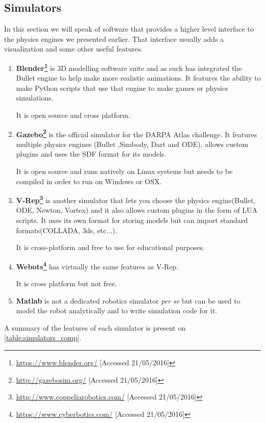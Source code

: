 \subsection{Simulators}
In this section we will speak of software that provides a higher level interface to the physics engines we presented earlier. That interface usually adds a visualization and some other useful features.
\begin{enumerate}

\item \textbf{Blender\footnote{\url{https://www.blender.org/} [Accessed 21/05/2016]}} is 3D modelling software suite and as such has integrated the Bullet engine to help make more realistic animations. It features the ability to make Python scripts that use that engine to make games or physics simulations. 

It is open source and cross platform.

\item \textbf{Gazebo\footnote{\url{http://gazebosim.org/} [Accessed 21/05/2016]}} is the official simulator for the DARPA Atlas challenge. It features multiple physics engines (Bullet ,Simbody, Dart and ODE), allows custom plugins and uses the SDF format for its models. 

It is open source and runs natively on Linux systems but needs to be compiled in order to run on Windows or OSX.

\item \textbf{V-Rep\footnote{\url{http://www.coppeliarobotics.com/} [Accessed 21/05/2016]}} is another simulator that lets you choose the physics engine(Bullet, ODE, Newton, Vortex) and it also allows custom plugins in the form of LUA scripts. It uses its own format for storing models but can import standard formats(COLLADA, 3ds, etc...).

It is cross-platform and free to use for educational purposes.

\item \textbf{Webots\footnote{\url{https://www.cyberbotics.com/} [Accessed 21/05/2016]}} has virtually the same features as V-Rep.

It is cross platform but not free.

\item \textbf{Matlab} is not a dedicated robotics simulator \textit{per se} but can be used to model the robot analytically and to write simulation code for it. 
\end{enumerate}

A summary of the features of each simulator is present on \cref{table:simulators_comp}.

